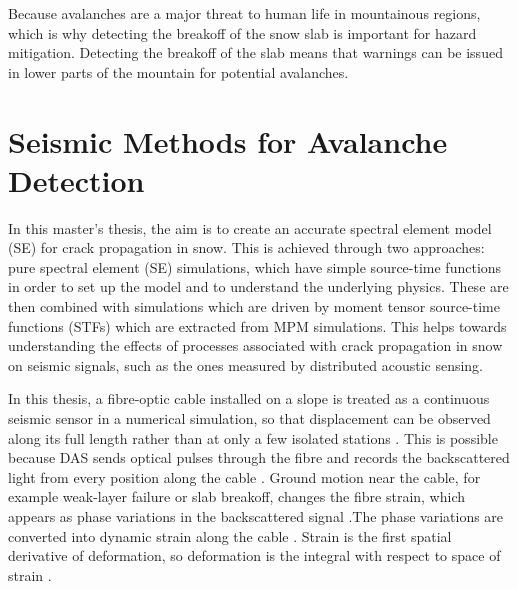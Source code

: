 
Because avalanches are a major threat to human life in mountainous regions, which is why detecting the breakoff of the snow slab is important for hazard mitigation. Detecting the breakoff of the slab means that warnings can be issued in lower parts of the mountain for potential avalanches. \par


  \section{Seismic Methods for Avalanche Detection}
  
  In this master's thesis, the aim is to create an accurate spectral element model (SE) for crack propagation in snow. This is achieved through two approaches: pure spectral element (SE) simulations, which have simple source-time functions in order to set up the model and to understand the underlying physics. These are then combined with simulations which are driven by moment tensor source-time functions (STFs) which are extracted from MPM simulations. This helps towards understanding the effects of processes associated with crack propagation in snow on seismic signals, such as the ones measured by distributed acoustic sensing. \par

  In this thesis, a fibre-optic cable installed on a slope is treated as a continuous seismic sensor in a numerical simulation, so that displacement can be observed along its full length rather than at only a few isolated stations \parencite{parkerDistributedAcousticSensing2014}. This is possible because DAS sends optical pulses through the fibre and records the backscattered light from every position along the cable \parencite{shatalinInterferometricOpticalTimedomain1998}. Ground motion near the cable, for example weak-layer failure or slab breakoff, changes the fibre strain, which appears as phase variations in the backscattered signal \parencite{hartogIntroductionDistributedOptical2017}.The phase variations are converted into dynamic strain along the cable \parencite{hartogIntroductionDistributedOptical2017}. Strain is the first spatial derivative of deformation, so deformation is the integral with respect to space of strain \parencite{trabattoniStrainDisplacementUsing2023}.  \par 


